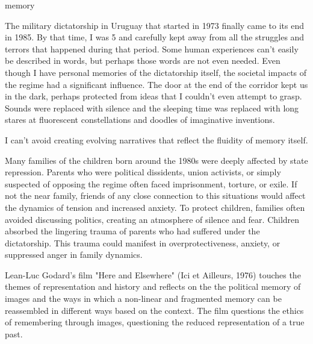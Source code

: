 



\begin{center}
\vspace*{\fill}
\Huge memory

\vspace{2cm}

\begin{flushright}
\large
\end{flushright}
\vspace*{\fill}
\end{center}

\normalsize

The military dictatorship in Uruguay that started in 1973 finally came to its end in 1985. By that time, I was 5 and carefully kept away from all the struggles and terrors that happened during that period. Some human experiences can't easily be described in words, but perhaps those words are not even needed. Even though I have personal memories of the dictatorship itself, the societal impacts of the regime had a significant influence. The door at the end of the corridor kept us in the dark, perhaps protected from ideas that I couldn't even attempt to grasp. Sounds were replaced with silence and the sleeping time was replaced with long stares at fluorescent constellations and doodles of imaginative inventions.    

I can't avoid creating evolving narratives that reflect the fluidity of memory itself. 

Many families of the children born around the 1980s were deeply affected by state repression. Parents who were political dissidents, union activists, or simply suspected of opposing the regime often faced imprisonment, torture, or exile. If not the near family, friends of any close connection to this situations would affect the dynamics of tension and increased anxiety. To protect children, families often avoided discussing politics, creating an atmosphere of silence and fear. Children absorbed the lingering trauma of parents who had suffered under the dictatorship. This trauma could manifest in overprotectiveness, anxiety, or suppressed anger in family dynamics.

Lean-Luc Godard’s film "Here and Elsewhere" (Ici et Ailleurs, 1976) touches the themes of representation and history and reflects on the the political memory of images and the ways in which a non-linear and fragmented memory can be reassembled in different ways based on the context. The film questions the ethics of remembering through images, questioning the reduced representation of a true past. 

